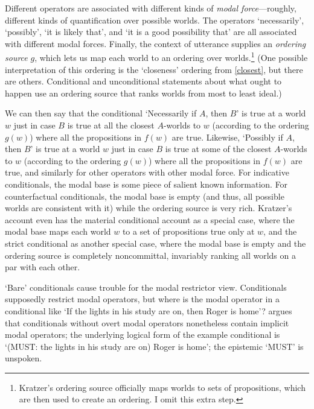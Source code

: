 Different operators are associated with different kinds of \emph{modal force}---roughly, different kinds of quantification over possible worlds.  The operators `necessarily', `possibly', `it is likely that', and `it is a good possibility that' are all associated with different modal forces.  Finally, the context of utterance supplies an \emph{ordering source} $g$, which lets us map each world to an ordering over worlds.\footnote{Kratzer's ordering source officially maps worlds to sets of propositions, which are then used to create an ordering.  I omit this extra step.}  (One possible interpretation of this ordering is the `closeness' ordering from \autoref{closest}, but there are others.  Conditional and unconditional statements about what ought to happen use an ordering source that ranks worlds from most to least ideal.)

We can then say that the conditional `Necessarily if $A$, then $B$' is true at a world $w$ just in case $B$ is true at all the closest $A$-worlds to $w$ (according to the ordering $g(w)$) where all the propositions in $f(w)$ are true.  Likewise,  `Possibly if $A$, then $B$' is true at a world $w$ just in case $B$ is true at some of the closest $A$-worlds to $w$ (according to the ordering $g(w)$) where all the propositions in $f(w)$ are true, and similarly for other operators with other modal force.  For indicative conditionals, the modal base is some piece of salient known information.  For counterfactual conditionals, the modal base is empty (and thus, all possible worlds are consistent with it) while the ordering source is very rich.  Kratzer's account even has the material conditional account as a special case, where the modal base maps each world $w$ to a set of propositions true only at $w$, and the strict conditional as another special case, where the modal base is empty and the ordering source is completely noncommittal, invariably ranking all worlds on a par with each other.

`Bare' conditionals cause trouble for the modal restrictor view.  Conditionals supposedly restrict modal operators, but where is the modal operator in a conditional like `If the lights in his study are on, then Roger is home'?   \citet{kratzer-conditional-necessity, kratzer-notional-modality} argues that conditionals without overt modal operators nonetheless contain implicit modal operators; the underlying logical form of the example conditional is `(MUST: the lights in his study are on) Roger is home'; the epistemic `MUST' is unspoken.

